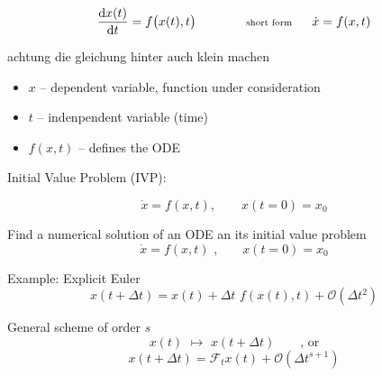 \begin{frame}
 

 $$\frac{\mbox{d} x(t)}{\mbox{d} t} = f\big(x(t) , t\big) \qquad \qquad {\scriptsize \text{short form} \qquad \dot{x} = f(x,t)}
$$

achtung die gleichung hinter auch klein machen

 \begin{itemize}
  \item $x$ -- dependent variable, function under consideration
  \item $t$ -- indenpendent variable (time)
  \item $f(x,t)$ -- defines the ODE
 \end{itemize}

\vspace{4ex}

 Initial Value Problem (IVP):
 
 $$\dot x = f( x , t ) ,\qquad x(t=0) = x_0$$



\end{frame}


\begin{frame}
  
  
\vspace{4ex}
    Find a numerical solution of an ODE an its initial value problem 
    \[ \dot{x} = f(x,t) \,\,\textrm{,} \quad \quad x(t=0) = x_0\]

   \vspace{2ex}

   Example: Explicit Euler
   \[ x(t + \Delta t ) = x(t) + \Delta t \,\, f(x(t),t) + \mathcal{O}(\Delta t^2)\]

   \vspace{2ex}

   General scheme of order $s$
    \[ x(t) \,\, \mapsto \,\, x(t+\Delta t) \quad \quad \text{, or}\]
    \[x(t + \Delta t) = \mathcal{F}_t x(t) + \mathcal{O}(\Delta t^{s+1})\]

\end{frame}




